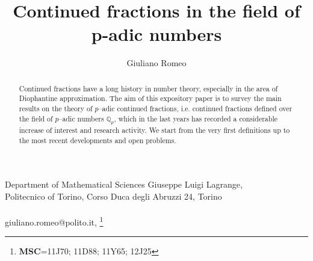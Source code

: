 \documentclass[12pt, reqno]{amsart}
\title{Continued fractions in the field of p-adic numbers}
\author{Giuliano Romeo}
\theoremstyle{plain}
\theoremstyle{definition}
\newcommand\blfootnote[1]{%
  \begingroup
  \renewcommand\thefootnote{}\footnote{#1}%
  \addtocounter{footnote}{-1}%
  \endgroup
}
\begin{document}
\maketitle

\begin{center}
Department of Mathematical Sciences Giuseppe Luigi Lagrange,\\
Politecnico of Torino, Corso Duca degli Abruzzi 24, Torino
\ \\ \ \\
giuliano.romeo@polito.it, \blfootnote {\textbf{MSC}=11J70; 11D88; 11Y65; 12J25}
\end{center}

\begin{abstract}
Continued fractions have a long history in number theory, especially in the area of Diophantine approximation. The aim of this expository paper is to survey the main results on the theory of $p$--adic continued fractions, i.e. continued fractions defined over the field of $p$--adic numbers $\mathbb{Q}_p$, which in the last years has recorded a considerable increase of interest and research activity. We start from the very first definitions up to the most recent developments and open problems.
\end{abstract}

\tableofcontents
\end{document}
